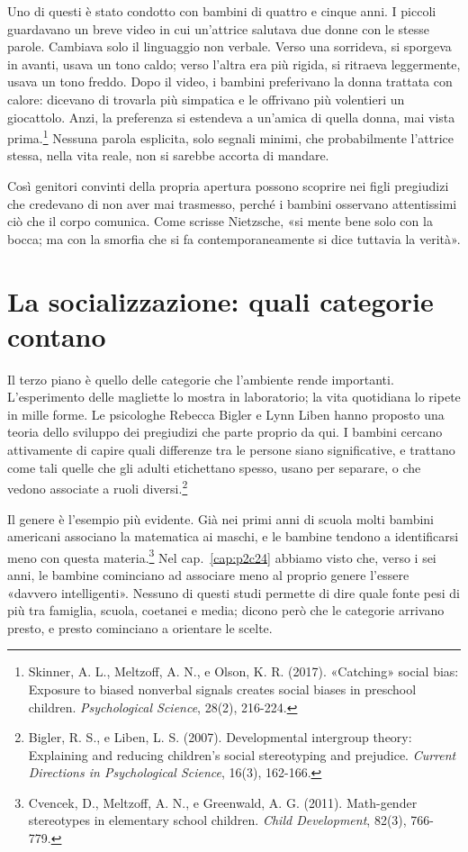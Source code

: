 Uno di questi è stato condotto con bambini di quattro e cinque anni. I piccoli guardavano un breve video in cui un'attrice salutava due donne con le stesse parole. Cambiava solo il linguaggio non verbale. Verso una sorrideva, si sporgeva in avanti, usava un tono caldo; verso l'altra era più rigida, si ritraeva leggermente, usava un tono freddo. Dopo il video, i bambini preferivano la donna trattata con calore: dicevano di trovarla più simpatica e le offrivano più volentieri un giocattolo. Anzi, la preferenza si estendeva a un'amica di quella donna, mai vista prima.\footnote{Skinner, A. L., Meltzoff, A. N., e Olson, K. R. (2017). «Catching» social bias: Exposure to biased nonverbal signals creates social biases in preschool children. \textit{Psychological Science}, 28(2), 216-224.} Nessuna parola esplicita, solo segnali minimi, che probabilmente l'attrice stessa, nella vita reale, non si sarebbe accorta di mandare.

Così genitori convinti della propria apertura possono scoprire nei figli pregiudizi che credevano di non aver mai trasmesso, perché i bambini osservano attentissimi ciò che il corpo comunica. Come scrisse Nietzsche, «si mente bene solo con la bocca; ma con la smorfia che si fa contemporaneamente si dice tuttavia la verità».

\section{La socializzazione: quali categorie contano}

Il terzo piano è quello delle categorie che l'ambiente rende importanti. L'esperimento delle magliette lo mostra in laboratorio; la vita quotidiana lo ripete in mille forme. Le psicologhe Rebecca Bigler e Lynn Liben hanno proposto una teoria dello sviluppo dei pregiudizi che parte proprio da qui. I bambini cercano attivamente di capire quali differenze tra le persone siano significative, e trattano come tali quelle che gli adulti etichettano spesso, usano per separare, o che vedono associate a ruoli diversi.\footnote{Bigler, R. S., e Liben, L. S. (2007). Developmental intergroup theory: Explaining and reducing children's social stereotyping and prejudice. \textit{Current Directions in Psychological Science}, 16(3), 162-166.}

Il genere è l'esempio più evidente. Già nei primi anni di scuola molti bambini americani associano la matematica ai maschi, e le bambine tendono a identificarsi meno con questa materia.\footnote{Cvencek, D., Meltzoff, A. N., e Greenwald, A. G. (2011). Math-gender stereotypes in elementary school children. \textit{Child Development}, 82(3), 766-779.} Nel cap.~\ref{cap:p2c24} abbiamo visto che, verso i sei anni, le bambine cominciano ad associare meno al proprio genere l'essere «davvero intelligenti». Nessuno di questi studi permette di dire quale fonte pesi di più tra famiglia, scuola, coetanei e media; dicono però che le categorie arrivano presto, e presto cominciano a orientare le scelte.

